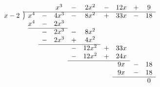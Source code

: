 \documentclass[preview]{standalone}
\newcommand{\longdiv}{\smash{\mkern-0.43mu\vstretch{1.31}{\hstretch{.7}{)}}\mkern-5.2mu\vstretch{1.31}{\hstretch{.7}{)}}}}
\begin{document}
\begin{equation*}
    \begin{array}{*1r @{\hskip\arraycolsep}c@{\hskip\arraycolsep} *{9}c}
      &          &     &   & x^3  & - & 2x^2  & - & 12x & + & 9\\
        \cline{2-11}
x - 2 & \longdiv & x^4 & - & 4x^3 & - & 8x^2  & + & 33x & - & 18\\
      &          & x^4 & - & 2x^3 &   &       &   &     &   & \\
        \cline{3-5}
      &          &     & - & 2x^3 & - & 8x^2  &   &     &   & \\
      &          &     & - & 2x^3 & + & 4x^2  &   &     &   & \\
        \cline{4-7}
      &          &     &   &      & - & 12x^2 & + & 33x &   & \\
      &          &     &   &      & - & 12x^2 & + & 24x &   & \\
        \cline{6-9}
      &          &     &   &      &   &       &   & 9x  & - & 18\\
      &          &     &   &      &   &       &   & 9x  & - & 18\\
        \cline{9-11}
      &          &     &   &      &   &       &   &     &   & 0\\
\end{array}
\end{equation*}
\end{document}
